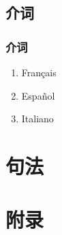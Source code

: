 \documentclass[UTF8,a4paper,titlepage,10pt]{report}
\begin{document}
\chapter{介词}
\label{sec:org852115c}

\section{介词}
\label{sec:orgd1a8719}

\begin{enumerate}
\item Français
\label{sec:org07454d8}

\item Español
\label{sec:org1d63eef}

\item Italiano
\label{sec:orgadb2b0b}
\end{enumerate}

\part{句法}
\label{sec:org91a0849}

\newpage
\part{附录}
\label{sec:org2144108}

\listoftables

\listoffigures

\printindex
\end{document}
